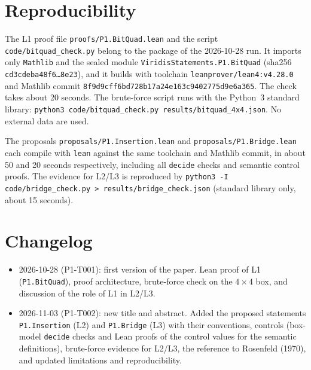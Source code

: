 \documentclass[11pt]{article}
\theoremstyle{definition}
\theoremstyle{remark}
\begin{document}
\section{Reproducibility}
{\sloppy

The L1 proof file \texttt{proofs/P1.BitQuad.lean} and the script
\texttt{code/bitquad\_check.py} belong to the package of the 2026-10-28 run. It imports only
\texttt{Mathlib} and the sealed module \texttt{ViridisStatements.P1.BitQuad}
(sha256 \texttt{cd3cdeba48f6\ldots{}8e23}), and it builds with toolchain
\texttt{leanprover/lean4:v4.28.0} and Mathlib commit
\texttt{8f9d9cff6bd728b17a24e163c9402775d9e6a365}. The check takes about 20
seconds. The brute-force script runs with the Python~3 standard library:
\texttt{python3 code/bitquad\_check.py results/bitquad\_4x4.json}. No external
data are used.

The proposals \texttt{proposals/P1.Insertion.lean} and
\texttt{proposals/P1.Bridge.lean} each compile with \texttt{lean} against the
same toolchain and Mathlib commit, in about 50 and 20 seconds respectively,
including all \texttt{decide} checks and semantic control proofs. The evidence
for L2/L3 is reproduced by \texttt{python3 -I code/bridge\_check.py >
results/bridge\_check.json} (standard library only, about 15 seconds).

}

\section*{Changelog}
\begin{itemize}
\item 2026-10-28 (P1-T001): first version of the paper. Lean proof of L1
  (\texttt{P1.BitQuad}), proof architecture, brute-force check on the
  $4\times4$ box, and discussion of the role of L1 in L2/L3.
\item 2026-11-03 (P1-T002): new title and abstract. Added the proposed
  statements \texttt{P1.Insertion} (L2) and \texttt{P1.Bridge} (L3) with their
  conventions, controls (box-model \texttt{decide} checks and Lean proofs of the
  control values for the semantic definitions), brute-force evidence for L2/L3,
  the reference to Rosenfeld (1970), and updated limitations and reproducibility.
\end{itemize}



\end{document}
